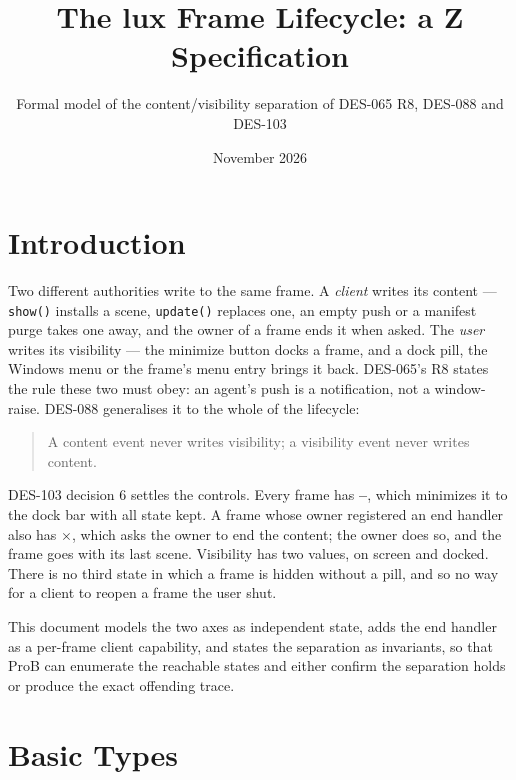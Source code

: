 \documentclass[a4paper,10pt,fleqn]{article}
\begin{document}
\title{The lux Frame Lifecycle: a Z Specification}
\author{Formal model of the content/visibility separation of DES-065 R8,
  DES-088 and DES-103}
\date{November 2026}
\maketitle

\section{Introduction}

Two different authorities write to the same frame.  A \emph{client} writes
its content --- \texttt{show()} installs a scene, \texttt{update()} replaces
one, an empty push or a manifest purge takes one away, and the owner of a
frame ends it when asked.  The \emph{user} writes its visibility --- the
minimize button docks a frame, and a dock pill, the Windows menu or the frame's
menu entry brings it back.  DES-065's R8 states the rule these two must obey:
an agent's push is a notification, not a window-raise.  DES-088 generalises it
to the whole of the lifecycle:

\begin{quote}
  A content event never writes visibility; a visibility event never writes
  content.
\end{quote}

DES-103 decision 6 settles the controls.  Every frame has \textbf{--}, which
minimizes it to the dock bar with all state kept.  A frame whose owner
registered an end handler also has \textbf{$\times$}, which asks the owner to
end the content; the owner does so, and the frame goes with its last scene.
Visibility has two values, on screen and docked.  There is no third state in
which a frame is hidden without a pill, and so no way for a client to reopen a
frame the user shut.

This document models the two axes as independent state, adds the end handler
as a per-frame client capability, and states the separation as invariants, so
that ProB can enumerate the reachable states and either confirm the separation
holds or produce the exact offending trace.

\section{Basic Types}
\end{document}
